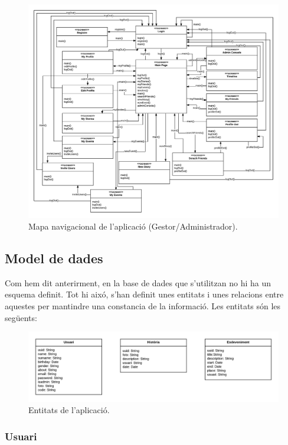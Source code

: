 \documentclass[11pt,catalan,listoffigures,listoftables]{tfgetsinf}
\begin{document}
\begin{figure}[H]
\includegraphics[width=15cm]{images/image10}
\centering
\caption[Figura 4.5]{Mapa navigacional de l'aplicació (Gestor/Administrador).}
\centering
\end{figure}

\subsection{Model de dades}

Com hem dit anterirment, en la base de dades que s'utilitzan no hi ha un esquema definit. Tot hi aixó, s'han definit unes entitats i unes relacions entre aquestes per mantindre una constancia de la informació. Les entitats són les següents:

\begin{figure}[h]
\includegraphics[width=15cm]{images/image6}
\centering
\caption[Figura 4.6]{Entitats de l'aplicació.}
\centering
\end{figure}

\subsubsection{Usuari}
\end{document}
